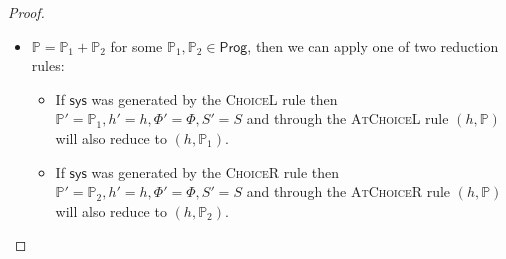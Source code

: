 \begin{lem}
\begin{proof}
\begin{itemize}
		\item $\mathds{P} = \mathds{P}_1 + \mathds{P}_2$ for some $\mathds{P}_1, \mathds{P}_2 \in \mathsf{Prog}$, then we can apply one of two reduction rules:
			\begin{itemize}
				\item If $\mathsf{sys}$ was generated by the \textsc{ChoiceL} rule then $\mathds{P}' = \mathds{P}_1, h' = h, \Phi' = \Phi, S' = S$ and through the \textsc{AtChoiceL} rule $(h, \mathds{P})$ will also reduce to $(h, \mathds{P}_1)$.
				\item If $\mathsf{sys}$ was generated by the \textsc{ChoiceR} rule then $\mathds{P}' = \mathds{P}_2, h' = h, \Phi' = \Phi, S' = S$ and through the \textsc{AtChoiceR} rule $(h, \mathds{P})$ will also reduce to $(h, \mathds{P}_2)$.
			\end{itemize}
	\end{itemize}
	\end{proof}
\end{lem}

